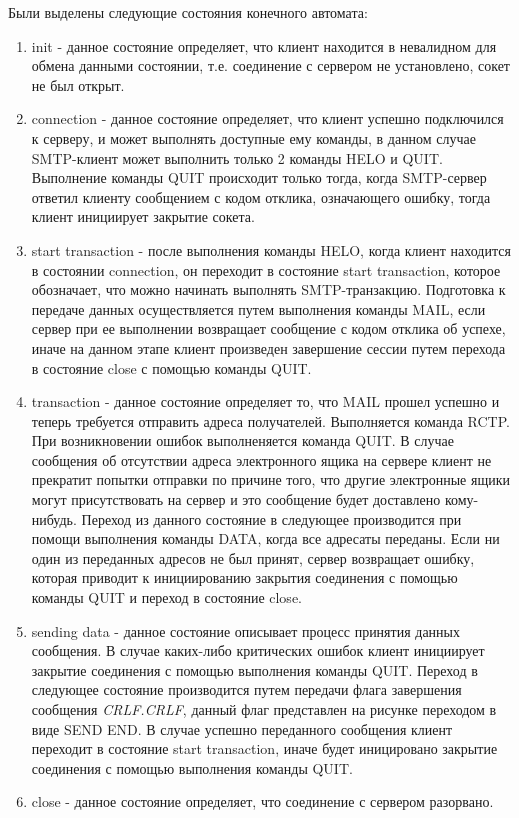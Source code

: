 \documentclass[a4paper,12pt]{report}
\begin{document}
	Были выделены следующие состояния конечного автомата:
	\begin{enumerate}
		\item init - данное состояние определяет, что клиент находится в невалидном для обмена данными состоянии, т.е. соединение с сервером не установлено, сокет не был открыт.
		\item connection - данное состояние определяет, что клиент успешно подключился к серверу, и может выполнять доступные ему команды, в данном случае SMTP-клиент может выполнить только 2 команды HELO и QUIT. Выполнение команды QUIT происходит только тогда, когда SMTP-сервер ответил клиенту сообщением с кодом отклика, означающего ошибку, тогда клиент инициирует закрытие сокета.
		\item start transaction - после выполнения команды HELO, когда клиент находится в состоянии connection,
		 он переходит в состояние start transaction, которое обозначает, что можно начинать выполнять
		  SMTP-транзакцию.
		   Подготовка к передаче данных осуществляется путем выполнения команды MAIL,
		    если сервер при ее выполнении возвращает сообщение с кодом отклика об успехе,
			 иначе на данном этапе клиент произведен завершение сессии путем перехода в состояние close с помощью команды QUIT.
		\item transaction - данное состояние определяет то, что MAIL прошел успешно и теперь
		 требуется отправить адреса получателей. 
		 Выполняется команда RCTP. При возникновении ошибок выполненяется команда QUIT.
		 В случае сообщения об отсутствии адреса электронного ящика на сервере клиент не прекратит 
		 попытки отправки по причине того, что другие электронные ящики могут присутствовать на сервер
		  и это сообщение будет доставлено кому-нибудь.
		   Переход из данного состояние в следующее производится при помощи выполнения команды
		    DATA, когда все адресаты переданы.
			 Если ни один из переданных адресов не был принят, сервер возвращает ошибку, 
			 которая приводит к инициированию закрытия соединения с помощью команды QUIT и переход в состояние close.
		\item sending data - данное состояние описывает процесс принятия данных сообщения. 
		 В случае каких-либо критических ошибок клиент инициирует закрытие соединения с помощью выполнения команды QUIT.
		  Переход в следующее состояние производится путем передачи флага завершения сообщения \textit{CRLF.CRLF},
		   данный флаг представлен на рисунке переходом в виде SEND END. 
		   В случае успешно переданного сообщения клиент переходит в состояние start transaction,
		    иначе будет иницировано закрытие соединения с помощью выполнения команды QUIT.
		\item close - данное состояние определяет, что соединение с сервером разорвано.
	\end{enumerate}
\end{document}
